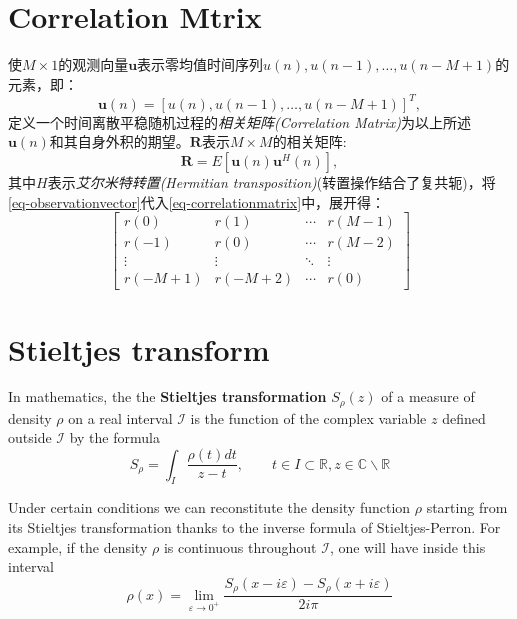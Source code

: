 \section{Correlation Mtrix}
使$M\times 1$的观测向量$\mathbf{u}$表示零均值时间序列$u(n),u(n-1),\dots,u(n-M+1)$的元素，即：
\begin{equation}
    \mathbf{u}(n) = \left[ u(n),u(n-1),\dots,u(n-M+1) \right]^T,
    \label{eq-observationvector}
\end{equation}
定义一个时间离散平稳随机过程的\emph{\textcolor[rgb]{1,0,0}{相关矩阵(Correlation Matrix)}}为以上所述$\mathbf{u}(n)$和其自身外积的期望。$\mathbf{R}$表示$M\times M$的相关矩阵:
\begin{equation}
    \mathbf{R} = E[\mathbf{u}(n)\mathbf{u}^H(n)],
    \label{eq-correlationmatrix}
\end{equation}
其中$H$表示\emph{\textcolor[rgb]{1,0,0}{艾尔米特转置(Hermitian transposition)}}(转置操作结合了复共轭)，将\cref{eq-observationvector}代入\cref{eq-correlationmatrix}中，展开得：
\begin{equation}
    \left[      
        \begin{array}{cccc}
        r(0) & r(1) & \cdots & r(M-1)\\
        r(-1) & r(0) & \cdots & r(M-2)\\
        \vdots & \vdots & \ddots & \vdots\\
        r(-M+1) & r(-M+2) & \cdots & r(0)
    \end{array}
    \right]
    \label{eq-correlationmatrixexpanded}
\end{equation}



\section{Stieltjes transform}
In mathematics, the the \textbf{\textcolor[rgb]{1,0,0}{Stieltjes transformation}} $S_{\rho}(z)$ of a measure of density $\rho$ on a real interval $\mathcal{I}$ is the function of the complex variable $z$ defined outside $\mathcal{I}$ by the formula
\begin{equation}
    S_{\rho} = \int_I \dfrac{\rho(t) dt}{z-t}, \qquad t \in I \subset \mathbb{R}, z\in \mathbb{C} \backslash \mathbb{R}
    \label{eq-Stieltjes}
\end{equation}

Under certain conditions we can reconstitute the density function $\rho$ starting from its Stieltjes transformation thanks to the inverse formula of Stieltjes-Perron. For example, if the density $\rho$ is continuous throughout $\mathcal{I}$, one will have inside this interval
\begin{equation}
    \rho(x) = \lim_{\varepsilon \rightarrow 0^{+}} \dfrac{S_{\rho}(x-i\varepsilon) - S_{\rho}(x+i\varepsilon)}{2i\pi}
    \label{eq-Stieltjesinverse}
\end{equation}




